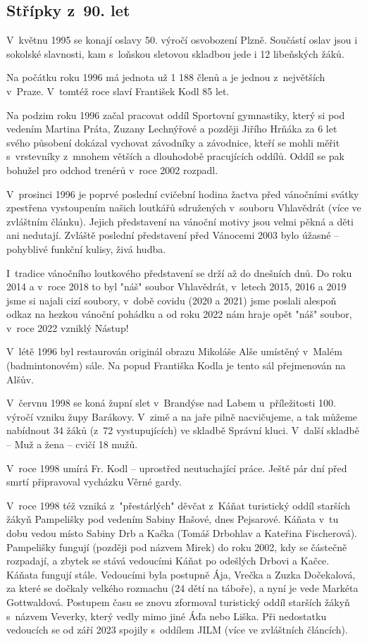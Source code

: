 \documentclass[a5paper, 11pt, twoside]{article}
\begin{document}
\subsection{Střípky z~90. let}

V~květnu 1995 se konají oslavy 50. výročí osvobození Plzně. Součástí
oslav jsou i sokolské slavnosti, kam s~loňskou sletovou skladbou jede i
12 libeňských žáků.

Na počátku roku 1996 má jednota už 1 188 členů a je jednou z~největších
v~Praze. V~tomtéž roce slaví František Kodl 85 let.

Na podzim roku 1996 začal pracovat oddíl Sportovní gymnastiky, který si
pod vedením Martina Práta, Zuzany Lechnýřové a později Jiřího Hrňáka za
6 let svého působení dokázal vychovat závodníky a závodnice, kteří se
mohli měřit s~vrstevníky z~mnohem větších a dlouhodobě pracujících
oddílů. Oddíl se pak bohužel pro odchod trenérů v~roce 2002 rozpadl.

V~prosinci 1996 je poprvé poslední cvičební hodina žactva před vánočními
svátky zpestřena vystoupením našich loutkářů sdružených v~souboru
Vhlavědrát (více ve zvláštním článku). Jejich představení na vánoční
motivy jsou velmi pěkná a děti ani nedutají. Zvláště poslední
představení před Vánocemi 2003 bylo úžasné -- pohyblivé funkční kulisy,
živá hudba.

I~tradice vánočního loutkového představení se drží až do dnešních dnů.
Do roku 2014 a v~roce 2018 to byl "náš" soubor Vhlavědrát, v~letech
2015, 2016 a 2019 jsme si najali cizí soubory, v~době covidu (2020 a
2021) jsme poslali alespoň odkaz na hezkou vánoční pohádku a od roku
2022 nám hraje opět "náš" soubor, v~roce 2022 vzniklý Nástup!

V~létě 1996 byl restaurován originál obrazu Mikoláše Alše umístěný
v~Malém (badmintonovém) sále. Na popud Františka Kodla je tento sál
přejmenován na Alšův.

V~červnu 1998 se koná župní slet v~Brandýse nad Labem u~příležitosti
100. výročí vzniku župy Barákovy. V~zimě a na jaře pilně nacvičujeme, a
tak můžeme nabídnout 34 žáků (z~72 vystupujících) ve skladbě Správní
kluci. V~další skladbě -- Muž a žena -- cvičí 18 mužů.

V~roce 1998 umírá Fr. Kodl -- uprostřed neutuchající práce. Ještě pár
dní před smrtí připravoval vycházku Věrné gardy.

V~roce 1998 též vzniká z~"přestárlých" děvčat z~Káňat turistický oddíl
starších žákyň Pampelišky pod vedením Sabiny Hašové, dnes Pejsarové.
Káňata v~tu dobu vedou místo Sabiny Drb a Kačka (Tomáš Drbohlav a
Kateřina Fischerová). Pampelišky fungují (později pod názvem Mirek) do
roku 2002, kdy se částečně rozpadají, a zbytek se stává vedoucími Káňat
po odešlých Drbovi a Kačce. Káňata fungují stále. Vedoucími byla
postupně Ája, Vrečka a Zuzka Dočekalová, za které se dočkaly velkého
rozmachu (24 dětí na táboře), a nyní je vede Markéta Gottwaldová.
Postupem času se znovu zformoval turistický oddíl starších žákyň
s~názvem Veverky, který vedly mimo jiné Áďa nebo Liška. Při nedostatku
vedoucích se od září 2023 spojily s~oddílem JILM (více ve zvláštních
článcích).
\end{document}
